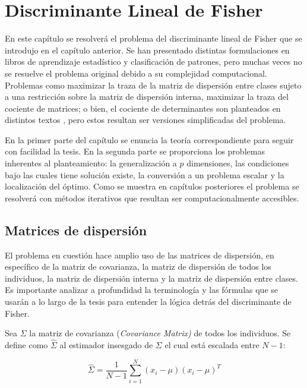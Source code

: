\chapter{Discriminante Lineal de Fisher}
\label{ch:chapter2}

En este capítulo se resolverá el problema del discriminante lineal de Fisher que se introdujo en el capítulo anterior. Se han presentado distintas formulaciones en libros de aprendizaje estadístico y clasificación de patrones, pero muchas veces no se resuelve el problema original debido a su complejidad computacional. \cite{wang2007trace}\cite{ngo2012trace} Problemas como maximizar la traza de la matriz de dispersión entre clases sujeto a una restricción sobre la matriz de dispersión interna, maximizar la traza del cociente de matrices; o bien, el cociente de determinantes son planteados en distintos textos \cite{duda2012pattern} \cite{hastie2009elements} \cite{mitchell2006discipline} \cite{fukunaga2013introduction}, pero estos resultan ser versiones simplificadas del problema. 

En la primer parte del capítulo se enuncia la teoría correspondiente para seguir con facilidad la tesis. En la segunda parte se proporciona los problemas inherentes al planteamiento: la generalización a $p$ dimensiones, las condiciones bajo las cuales tiene solución existe, la conversión a un problema escalar y la localización del óptimo. Como se muestra en capítulos posteriores el problema se resolverá con métodos iterativos que resultan ser computacionalmente accesibles. 



\section{Matrices de dispersión}
El problema en cuestión hace amplio uso de las matrices de dispersión, en específico de la matriz de covarianza, la matriz de dispersión de todos los individuos, la matriz de dispersión interna y la matriz de dispersión entre clases. Es importante analizar a profundidad la terminología y las fórmulas que se usarán a lo largo de la tesis para entender la lógica detrás del discriminante de Fisher.

Sea $\Sigma$ la matriz de covarianza (\textit{Covariance Matrix)} de todos los individuos. Se define como $\widehat{\Sigma}$ al estimador insesgado de $\Sigma$ el cual está escalada entre $N-1$:

\begin{equation} \label{eq:2.1}
\widehat{\Sigma} = \frac{1}{N-1} \sum_{i=1}^{N}(x_i - \mu)(x_i - \mu)^T	
\end{equation}


